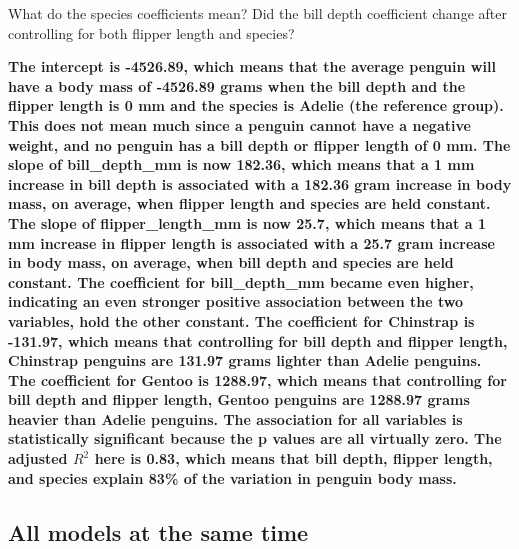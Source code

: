 \documentclass[
]{article}
\begin{document}
What do the species coefficients mean? Did the bill depth coefficient
change after controlling for both flipper length and species?

\textbf{The intercept is -4526.89, which means that the average penguin
will have a body mass of -4526.89 grams when the bill depth and the
flipper length is 0 mm and the species is Adelie (the reference group).
This does not mean much since a penguin cannot have a negative weight,
and no penguin has a bill depth or flipper length of 0 mm. The slope of
bill\_depth\_mm is now 182.36, which means that a 1 mm increase in bill
depth is associated with a 182.36 gram increase in body mass, on
average, when flipper length and species are held constant. The slope of
flipper\_length\_mm is now 25.7, which means that a 1 mm increase in
flipper length is associated with a 25.7 gram increase in body mass, on
average, when bill depth and species are held constant. The coefficient
for bill\_depth\_mm became even higher, indicating an even stronger
positive association between the two variables, hold the other constant.
The coefficient for Chinstrap is -131.97, which means that controlling
for bill depth and flipper length, Chinstrap penguins are 131.97 grams
lighter than Adelie penguins. The coefficient for Gentoo is 1288.97,
which means that controlling for bill depth and flipper length, Gentoo
penguins are 1288.97 grams heavier than Adelie penguins. The association
for all variables is statistically significant because the p values are
all virtually zero. The adjusted \(R^2\) here is 0.83, which means that
bill depth, flipper length, and species explain 83\% of the variation in
penguin body mass.}

\hypertarget{all-models-at-the-same-time}{%
\subsection{All models at the same
time}\label{all-models-at-the-same-time}}
\end{document}
